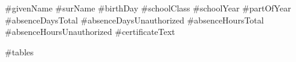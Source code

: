 \documentclass[11pt,a4paper]{article}
\begin{document}
#givenName
#surName
#birthDay
#schoolClass
#schoolYear
#partOfYear
#absenceDaysTotal
#absenceDaysUnauthorized
#absenceHoursTotal
#absenceHoursUnauthorized
#certificateText

#tables
\end{document}
